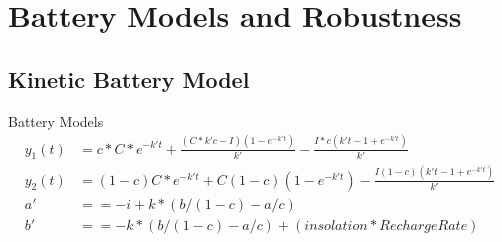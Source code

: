 \section{Battery Models and Robustness}
\subsection{Kinetic Battery Model}

\begin{frame}[fragile]{Battery Models}{\insertsubsection}
	\centering
	\begin{equation*}
	\begin{aligned}
		y_1(t) &= c*C*e^{-k't}+\frac{(C*k'c-I)(1-e^{-k't})}{k'}-\frac{I*c(k't-1+e^{-k't})}{k'}\\
		y_2(t) &= (1-c)C*e^{-k't}+C(1-c)(1-e^{-k't})-\frac{I(1-c)(k't-1+e^{-k't})}{k'}\\
		a '&== -i+k*(b/(1-c)-a/c)\\
		b '&== -k*(b/(1-c)-a/c)+(insolation*RechargeRate)
	\end{aligned}
	\end{equation*}
\end{frame}

